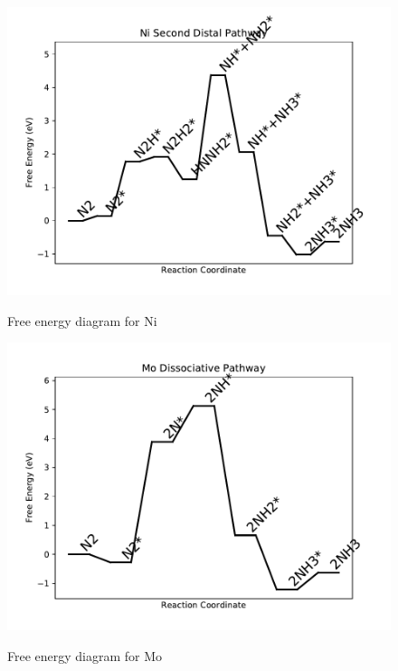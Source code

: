 \documentclass{article}
\begin{document}
\begin{figure}
\includegraphics[width=1\linewidth]{data/plots/Ni_distal_2.pdf}
\label{fig:Ni_distal_2}
\caption{Free energy diagram for Ni}
\end{figure}

\begin{figure}
\includegraphics[width=1\linewidth]{data/plots/Mo_dissociative.pdf}
\label{fig:Mo_dissociative}
\caption{Free energy diagram for Mo}
\end{figure}
\end{document}
